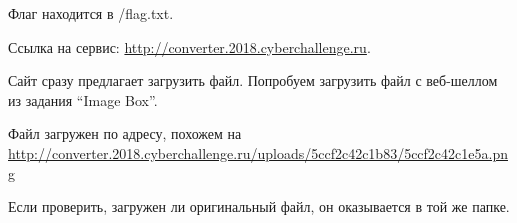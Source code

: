 
Флаг находится в /flag.txt.

Ссылка на сервис: \url{http://converter.2018.cyberchallenge.ru}.

\solutionSection

Сайт сразу предлагает загрузить файл. Попробуем загрузить файл с веб-шеллом из задания “Image Box”.


Файл загружен по адресу, похожем на \url{http://converter.2018.cyberchallenge.ru/uploads/5ccf2c42c1b83/5ccf2c42c1e5a.png}

Если проверить, загружен ли оригинальный файл, он оказывается в той же папке.


